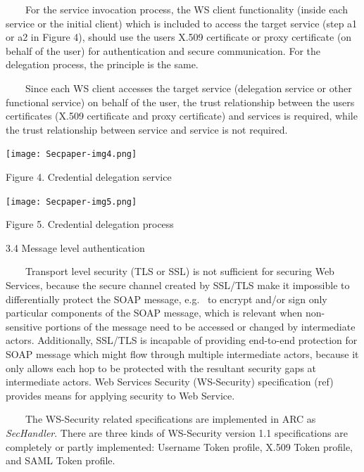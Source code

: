 \documentclass{article}
\begin{document}
\ \ \ \ For the service invocation process, the WS client functionality
(inside each service or the initial client) which is included to access
the target service (step a1 or a2 in Figure 4), should use the
user{\textquotesingle}s X.509 certificate or proxy certificate (on
behalf of the user) for authentication and secure communication. For
the delegation process, the principle is the same.

\ \ \ \ Since each WS client accesses the target service (delegation
service or other functional service) on behalf of the user, the trust
relationship between the user{\textquotesingle}s certificates (X.509
certificate and proxy certificate) and services is required, while the
trust relationship between service and service is not required.

 

\begin{center}
\texttt{[image: Secpaper-img4.png]}
\end{center}

\bigskip


\bigskip

{\centering
Figure 4. Credential delegation service
\par}


\bigskip



\begin{center}
\texttt{[image: Secpaper-img5.png]}
\end{center}
{\centering
Figure 5. Credential delegation process
\par}

3.4 Message level authentication

\ \ \ \ Transport level security (TLS or SSL) is not sufficient for
securing Web Services, because the secure channel created by SSL/TLS
make it impossible to differentially protect the SOAP message, e.g.
\ to encrypt and/or sign only particular components of the SOAP
message, which is relevant when non-sensitive portions of the message
need to be accessed or changed by intermediate actors. Additionally,
SSL/TLS is incapable of providing end-to-end protection for SOAP
message which might flow through multiple intermediate actors, because
it only allows each hop to be protected with the resultant security
gaps at intermediate actors. Web Services Security (WS-Security)
specification (ref) provides means for applying security to Web
Service.

\ \ \ \ The WS-Security related specifications are implemented in ARC as
\textit{SecHandler}. There are three kinds of WS-Security version 1.1
specifications are completely or partly implemented: Username Token
profile, X.509 Token profile, and SAML Token profile.
\end{document}
